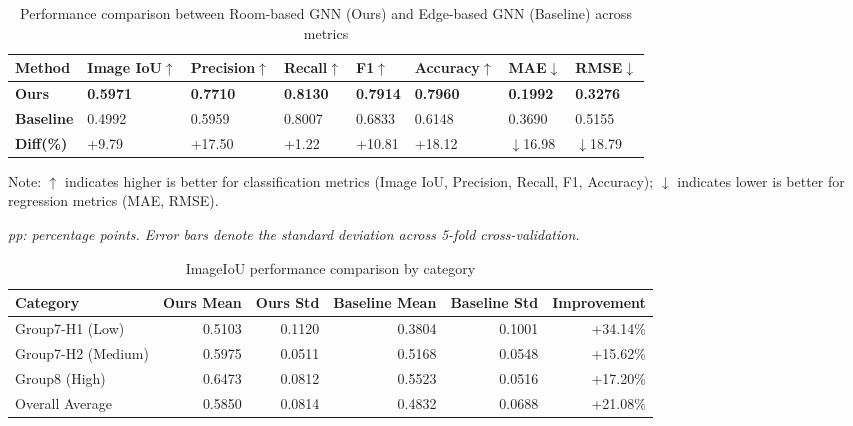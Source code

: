 \begin{table}[t]
\caption{Performance comparison between Room-based GNN (Ours) and Edge-based GNN (Baseline) across metrics}
\label{tab:main_results}

\centering

\begin{tabularx}{\textwidth}{l*{7}{C}}   %
\toprule
\textbf{Method} & 
\textbf{Image IoU}$\uparrow$ & 
\textbf{Precision}$\uparrow$ & 
\textbf{Recall}$\uparrow$ & 
\textbf{F1}$\uparrow$ & 
\textbf{Accuracy}$\uparrow$ & 
\textbf{MAE}$\downarrow$ & 
\textbf{RMSE}$\downarrow$ \\
\midrule
\textbf{Ours}      & \textbf{0.5971} & \textbf{0.7710} & \textbf{0.8130} & \textbf{0.7914} & \textbf{0.7960} & \textbf{0.1992} & \textbf{0.3276} \\
\textbf{Baseline}  & 0.4992          & 0.5959          & 0.8007          & 0.6833          & 0.6148          & 0.3690          & 0.5155          \\
\textbf{Diff(\%)}      & +9.79         & +17.50         & +1.22         & +10.81         & +18.12         & $\downarrow$16.98 & $\downarrow$18.79 \\
\bottomrule
\end{tabularx}

\par\smallskip
{\small Note: $\uparrow$ indicates higher is better for classification metrics (Image IoU, Precision, Recall, F1, Accuracy);
$\downarrow$ indicates lower is better for regression metrics (MAE, RMSE).}

\textit{pp: percentage points. Error bars denote the standard deviation across 5-fold cross-validation.}
\end{table}


\begin{table}[t]
\centering
\caption{Image{IoU} performance comparison by category}
\label{tab:per_condition}
\begin{tabular*}{\textwidth}{@{\extracolsep{\fill}} lrrrrr @{}}
\toprule
Category & \multicolumn{1}{c}{Ours Mean} & \multicolumn{1}{c}{Ours Std} & \multicolumn{1}{c}{Baseline Mean} & \multicolumn{1}{c}{Baseline Std} & \multicolumn{1}{r}{Improvement} \\
\midrule
Group7-H1 (Low)      & 0.5103 & 0.1120 & 0.3804 & 0.1001 & +34.14\% \\
Group7-H2 (Medium)   & 0.5975 & 0.0511 & 0.5168 & 0.0548 & +15.62\% \\
Group8 (High)   & 0.6473 & 0.0812 & 0.5523 & 0.0516 & +17.20\% \\
\midrule
Overall Average & 0.5850 & 0.0814 & 0.4832 & 0.0688 & +21.08\% \\
\bottomrule
\end{tabular*}
\end{table}



